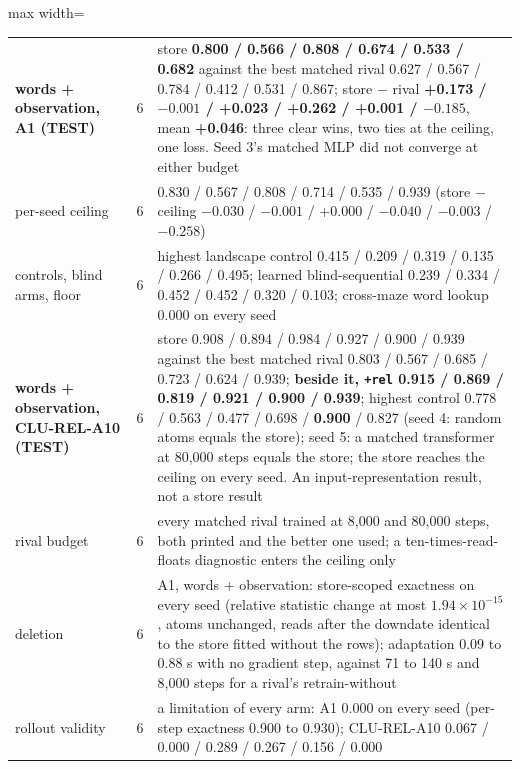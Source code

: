 \documentclass{article} %
\newcommand{\sci}[2]{\ensuremath{#1\times10^{#2}}}
\begin{document}
\begin{table}[h]
\begin{adjustbox}{max width=\linewidth}
\begin{tabular}{p{2.3cm}p{0.8cm}p{11.2cm}}
\midrule
\textbf{words + observation, A1 (TEST)} & 6 & store \textbf{0.800 / 0.566 / 0.808 / 0.674 / 0.533 / 0.682} against the best matched rival 0.627 / 0.567 / 0.784 / 0.412 / 0.531 / 0.867; store $-$ rival \textbf{+0.173 / $-0.001$ / +0.023 / +0.262 / +0.001 / $-0.185$}, mean \textbf{+0.046}: three clear wins, two ties at the ceiling, one loss. Seed 3's matched MLP did not converge at either budget \\
\quad per-seed ceiling & 6 & 0.830 / 0.567 / 0.808 / 0.714 / 0.535 / 0.939 (store $-$ ceiling $-0.030$ / $-0.001$ / +0.000 / $-0.040$ / $-0.003$ / $-0.258$) \\
\quad controls, blind arms, floor & 6 & highest landscape control 0.415 / 0.209 / 0.319 / 0.135 / 0.266 / 0.495; learned blind-sequential 0.239 / 0.334 / 0.452 / 0.452 / 0.320 / 0.103; cross-maze word lookup 0.000 on every seed \\
\textbf{words + observation, CLU-REL-A10 (TEST)} & 6 & store 0.908 / 0.894 / 0.984 / 0.927 / 0.900 / 0.939 against the best matched rival 0.803 / 0.567 / 0.685 / 0.723 / 0.624 / 0.939; \textbf{beside it, \texttt{+rel} 0.915 / 0.869 / 0.819 / 0.921 / 0.900 / 0.939}; highest control 0.778 / 0.563 / 0.477 / 0.698 / \textbf{0.900} / 0.827 (seed 4: random atoms equals the store); seed 5: a matched transformer at 80,000 steps equals the store; the store reaches the ceiling on every seed. An input-representation result, not a store result \\
\midrule
rival budget & 6 & every matched rival trained at 8,000 and 80,000 steps, both printed and the better one used; a ten-times-read-floats diagnostic enters the ceiling only \\
deletion & 6 & A1, words + observation: store-scoped exactness on every seed (relative statistic change at most \sci{1.94}{-15}, atoms unchanged, reads after the downdate identical to the store fitted without the rows); adaptation 0.09 to 0.88 s with no gradient step, against 71 to 140 s and 8,000 steps for a rival's retrain-without \\
rollout validity & 6 & a limitation of every arm: A1 0.000 on every seed (per-step exactness 0.900 to 0.930); CLU-REL-A10 0.067 / 0.000 / 0.289 / 0.267 / 0.156 / 0.000 \\
\bottomrule
\end{tabular}\end{adjustbox}
\end{table}
\end{document}
